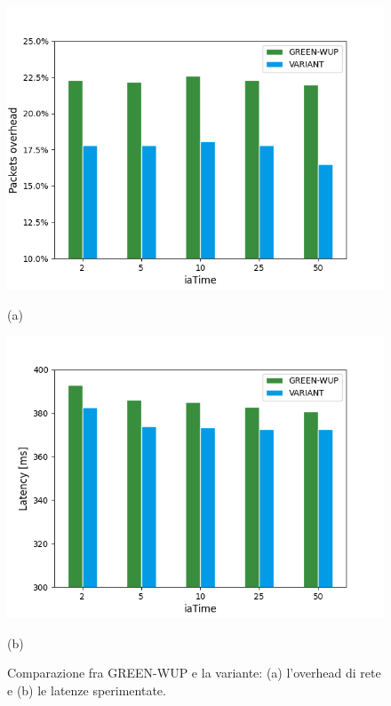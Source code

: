 \documentclass[binding=0.6cm,TFA]{sapthesis}
\begin{document}
\begin{figure}[h]
    \centering
    \begin{minipage}{.5\textwidth}
        \centering
        \includegraphics[width=1\linewidth]{overhead_plot.png}
        \caption*{(a)}
    \end{minipage}%
    \begin{minipage}{.5\textwidth}
        \centering
        \includegraphics[width=1\linewidth]{latency_plot.png}
        \caption*{(b)}
    \end{minipage}
    \caption{Comparazione fra GREEN-WUP e la variante: (a) l'overhead di rete e (b) le latenze sperimentate.}
\end{figure}
\end{document}
